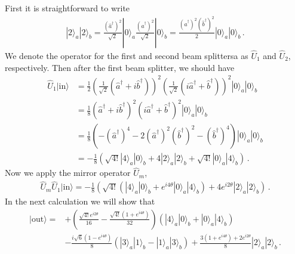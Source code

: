\documentclass[11pt, oneside]{book}
\theoremstyle{break}
\theoremstyle{break}
\begin{document}
\chapter{}
First it is straightforward to write
\begin{align*}
|2\rangle_a |2\rangle_b = \frac{(\hat{a}^\dagger)^2}{\sqrt{
2}}|0\rangle_a
\frac{(\hat{a}^\dagger)^2}{\sqrt{
2}}
 |0\rangle_b = \frac{(\hat{a}^\dagger)^2(\hat{b}^\dagger)^2}{2} |0\rangle_a |0\rangle_b\,.
\end{align*}
We denote the operator for the first and second beam splittersa as $\hat{U}_1$ and $\hat{U}_2$, respectively. Then after the first beam splitter, we should have
\begin{align*}
\hat{U}_1|\text{in}\rangle 
&= \frac{1}{2}\left(\frac{1}{\sqrt{2}}(\hat{a}^\dagger + i\hat{b}^\dagger) \right)^2
\left(\frac{1}{\sqrt{2}}(i\hat{a}^\dagger + \hat{b}^\dagger) \right)^2 |0\rangle_a |0\rangle_b\\
&= \frac{1}{8}(\hat{a}^\dagger+i\hat{b}^\dagger)^2(i\hat{a}^\dagger + \hat{b}^\dagger)^2|0\rangle_a|0\rangle_b\\
&= \frac{1}{8}\left( -(\hat{a}^\dagger)^4 - 2(\hat{a}^\dagger)^2 (\hat{b}^\dagger)^2 -(\hat{b}^\dagger)^4 \right)|0\rangle_a | 0\rangle_b\\
&= -\frac{1}{8}\left( \sqrt{4!}|4\rangle_a | 0\rangle_b + 4|2\rangle_a | 2\rangle_b +\sqrt{4!}|0\rangle_a | 4\rangle_b\right)\,.
\end{align*}
Now we apply the mirror operator $\hat{U}_m$,
\begin{align*}
\hat{U}_m \hat{U}_{1} |\text{in}\rangle = -\frac{1}{8}\left( \sqrt{4!}\left(|4\rangle_a | 0\rangle_b + e^{i4\theta}|0\rangle_a | 4\rangle_b \right)+4e^{i2\theta}|2\rangle_a |2\rangle_b\right)\,.
\end{align*}
In the next calculation we will show that
\begin{align*}
|\text{out}\rangle = 
&+\left(\frac{\sqrt{4!}e^{i2\theta}}{16} - \frac{\sqrt{4!}(1+e^{i4\theta})}{32}\right)\left( |4\rangle_a | 0\rangle_b + |0\rangle_a|4\rangle_b\right)\\
&-\frac{i\sqrt{6}(1-e^{i4\theta})}{8}(|3\rangle_a|1\rangle_b - |1\rangle_a |3\rangle_b)+ \frac{3(1+e^{i4\theta})+ 2e^{i2\theta}}{8}|2\rangle_a|2\rangle_b\,.
\end{align*}
\newpage
\end{document}
